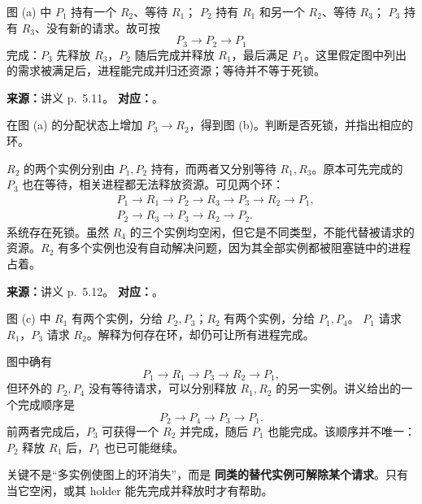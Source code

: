 \begin{checkedsolution}
图 (a) 中 $P_1$ 持有一个 $R_2$、等待 $R_1$；
$P_2$ 持有 $R_1$ 和另一个 $R_2$、等待 $R_3$；
$P_3$ 持有 $R_3$、没有新的请求。故可按
\[
  P_3\longrightarrow P_2\longrightarrow P_1
\]
完成：$P_3$ 先释放 $R_3$，$P_2$ 随后完成并释放 $R_1$，最后满足 $P_1$。这里假定图中列出的需求被满足后，进程能完成并归还资源；等待并不等于死锁。
\end{checkedsolution}


\textbf{来源：}讲义 p.~5.11。\quad
\textbf{对应：}。

在图 (a) 的分配状态上增加 $P_3\rightarrow R_2$，得到图 (b)。判断是否死锁，并指出相应的环。

\begin{checkedsolution}
$R_2$ 的两个实例分别由 $P_1,P_2$ 持有，而两者又分别等待 $R_1,R_3$。原本可先完成的 $P_3$ 也在等待，相关进程都无法释放资源。可见两个环：
\[
\begin{aligned}
  &P_1\rightarrow R_1\rightarrow P_2\rightarrow R_3
    \rightarrow P_3\rightarrow R_2\rightarrow P_1,\\
  &P_2\rightarrow R_3\rightarrow P_3\rightarrow R_2\rightarrow P_2.
\end{aligned}
\]
系统存在死锁。虽然 $R_4$ 的三个实例均空闲，但它是不同类型，不能代替被请求的资源。$R_2$ 有多个实例也没有自动解决问题，因为其全部实例都被阻塞链中的进程占着。
\end{checkedsolution}


\textbf{来源：}讲义 p.~5.12。\quad
\textbf{对应：}。

图 (c) 中 $R_1$ 有两个实例，分给 $P_2,P_3$；$R_2$ 有两个实例，分给 $P_1,P_4$。
$P_1$ 请求 $R_1$，$P_3$ 请求 $R_2$。解释为何存在环，却仍可让所有进程完成。

\begin{checkedsolution}
图中确有
\[
  P_1\rightarrow R_1\rightarrow P_3\rightarrow R_2\rightarrow P_1,
\]
但环外的 $P_2,P_4$ 没有等待请求，可以分别释放 $R_1,R_2$ 的另一实例。讲义给出的一个完成顺序是
\[
  P_2\longrightarrow P_4\longrightarrow P_3\longrightarrow P_1.
\]
前两者完成后，$P_3$ 可获得一个 $R_2$ 并完成，随后 $P_1$ 也能完成。该顺序并不唯一：$P_2$ 释放 $R_1$ 后，$P_1$ 也已可能继续。

关键不是“多实例使图上的环消失”，而是 \textbf{同类的替代实例可解除某个请求}。只有当它空闲，或其 holder 能先完成并释放时才有帮助。
\end{checkedsolution}

